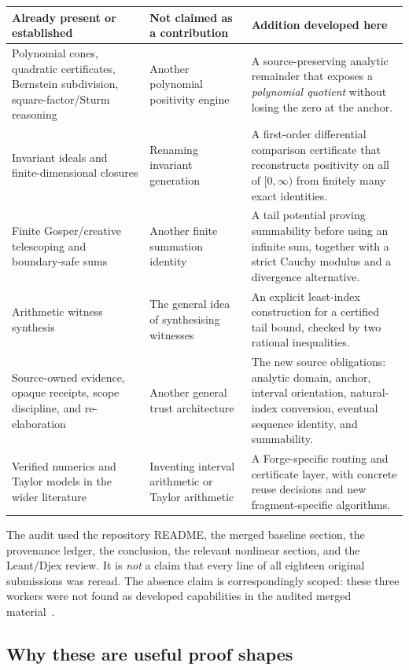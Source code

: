 \documentclass[11pt,a4paper]{article}
\theoremstyle{definition}\newtheorem{definition}[theorem]{Definition}
\begin{document}
\begin{longtable}{@{}P{.25\textwidth}P{.31\textwidth}P{.37\textwidth}@{}}
\toprule
Already present or established & Not claimed as a contribution & Addition developed here \\
\midrule\endhead
Polynomial cones, quadratic certificates, Bernstein subdivision, square-factor/Sturm reasoning &
Another polynomial positivity engine &
A source-preserving analytic remainder that exposes a \emph{polynomial quotient} without losing the zero at the anchor. \\
Invariant ideals and finite-dimensional closures &
Renaming invariant generation &
A first-order differential comparison certificate that reconstructs positivity on all of $[0,\infty)$ from finitely many exact identities. \\
Finite Gosper/creative telescoping and boundary-safe sums &
Another finite summation identity &
A tail potential proving summability before using an infinite sum, together with a strict Cauchy modulus and a divergence alternative. \\
Arithmetic witness synthesis &
The general idea of synthesising witnesses &
An explicit least-index construction for a certified tail bound, checked by two rational inequalities. \\
Source-owned evidence, opaque receipts, scope discipline, and re-elaboration &
Another general trust architecture &
The new source obligations: analytic domain, anchor, interval orientation, natural-index conversion, eventual sequence identity, and summability. \\
Verified numerics and Taylor models in the wider literature &
Inventing interval arithmetic or Taylor arithmetic &
A Forge-specific routing and certificate layer, with concrete reuse decisions and new fragment-specific algorithms. \\
\bottomrule
\end{longtable}

The audit used the repository README, the merged baseline section, the
provenance ledger, the conclusion, the relevant nonlinear section, and the
Leant/Djex review. It is \emph{not} a claim that every line of all eighteen
original submissions was reread. The absence claim is correspondingly scoped:
these three workers were not found as developed capabilities in the audited
merged material~\cite{forge-baseline,forge-nonlinear,forge-neighbours}.

\subsection{Why these are useful proof shapes}
\end{document}
